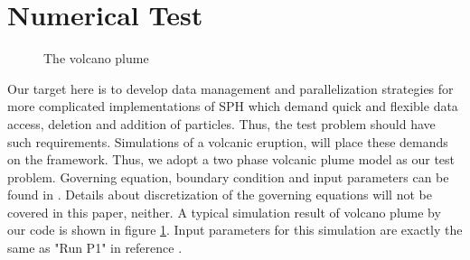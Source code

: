 \documentclass[conference,compsoc]{IEEEtran}
\begin{document}
\section{Numerical Test}
\begin{figure}[!t]
\centering
{}
\label{fig:plume_photo}
\hfil
{}
\label{fig:plume_simulation}
\caption{The volcano plume}
\label{fig:Plume}
\end{figure}
Our target here is to develop data management and parallelization strategies for more complicated implementations of SPH which demand quick and flexible data access, deletion and addition of particles. Thus, the test problem should have such requirements. Simulations of a volcanic eruption, will place these demands on the framework. Thus, we adopt a two phase volcanic plume model\cite{suzuki2005numerical} as our test problem. Governing equation, boundary condition and input parameters can be found in \cite{suzuki2005numerical}. Details about discretization of the governing equations will not be covered in this paper, neither. A typical simulation result of volcano plume by our code is shown in figure \ref{fig:Plume}. Input parameters for this simulation are exactly the same as "Run P1" in reference \cite{suzuki2005numerical}.
%
\end{document}
